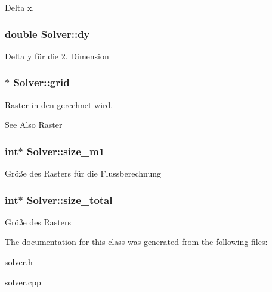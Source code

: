 Delta x. \hypertarget{classSolver_a716c9ccbc57382159d803e8fe7e9874b}{
\subsubsection[{dy}]{\setlength{\rightskip}{0pt plus 5cm}double Solver\-::dy}}\label{classSolver_a716c9ccbc57382159d803e8fe7e9874b}
Delta y für die 2. Dimension \hypertarget{classSolver_a147ba19192faf8f24dadfc569f3d403f}{
\subsubsection[{grid}]{$\ast$ Solver\-::grid}}\label{classSolver_a147ba19192faf8f24dadfc569f3d403f}
Raster in den gerechnet wird. \begin{DoxySeeAlso}{See Also}
Raster 
\end{DoxySeeAlso}
\hypertarget{classSolver_ab954613f6a40bbcbcbc7c04469f36db5}{
\subsubsection[{size\-\_\-m1}]{\setlength{\rightskip}{0pt plus 5cm}int$\ast$ Solver\-::size\-\_\-m1}}\label{classSolver_ab954613f6a40bbcbcbc7c04469f36db5}
Größe des Rasters für die Flussberechnung \hypertarget{classSolver_accc6d00868567cda6fc234b3c1934a13}{
\subsubsection[{size\-\_\-total}]{\setlength{\rightskip}{0pt plus 5cm}int$\ast$ Solver\-::size\-\_\-total}}\label{classSolver_accc6d00868567cda6fc234b3c1934a13}
Größe des Rasters 

The documentation for this class was generated from the following files\-:\begin{DoxyCompactItemize}
\item 
solver.\-h\item 
solver.\-cpp\end{DoxyCompactItemize}
